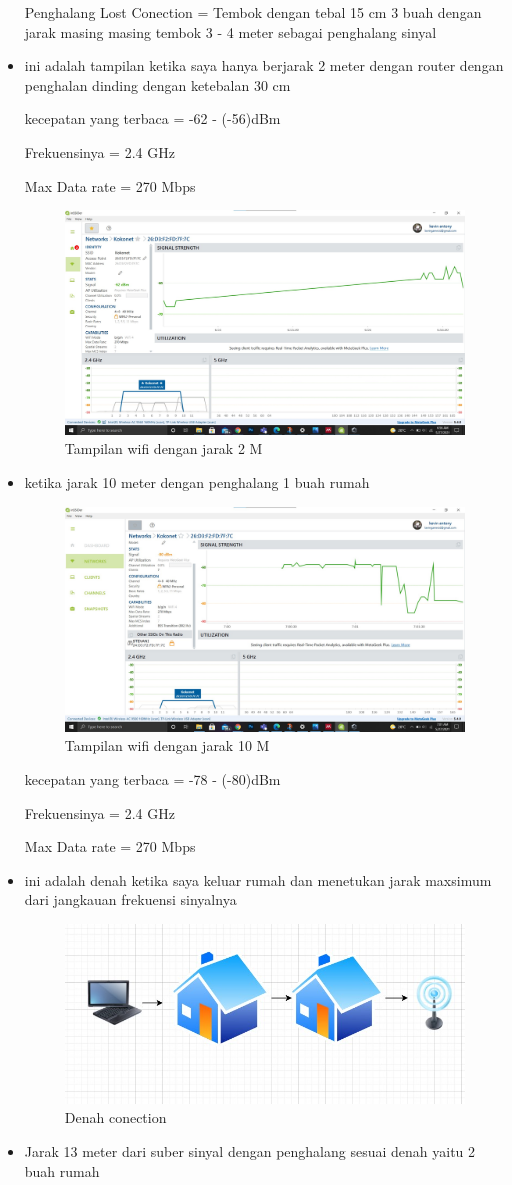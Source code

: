 \documentclass[conference]{IEEEtran}
\begin{document}
\begin{itemize}
Penghalang Lost Conection = Tembok dengan tebal 15 cm 3 buah dengan jarak masing masing tembok 3 - 4 meter sebagai penghalang sinyal 

\item ini adalah tampilan ketika saya hanya berjarak 2 meter dengan router dengan penghalan dinding dengan ketebalan 30 cm
\vspace{2pt}

kecepatan yang terbaca = -62 - (-56)dBm 
\vspace{1pt}

Frekuensinya = 2.4 GHz
\vspace{1pt}

Max Data rate = 270 Mbps
    \begin{figure}[h]
\centering
    \includegraphics[width=.4\textwidth]{image/007.jpg}
     \caption{Tampilan wifi dengan jarak 2 M}
     \end{figure}
\item ketika jarak 10 meter dengan penghalang 1 buah rumah
    \begin{figure}[h]
\centering
    \includegraphics[width=.3\textwidth]{image/008.jpg}
     \caption{Tampilan wifi dengan jarak 10 M}
     \end{figure}
     \vspace{2cm}
     
kecepatan yang terbaca = -78 - (-80)dBm 
\vspace{1pt}

Frekuensinya = 2.4 GHz
\vspace{1pt}

Max Data rate = 270 Mbps
\item ini adalah denah ketika saya keluar rumah dan menetukan jarak maxsimum dari jangkauan frekuensi sinyalnya
    \begin{figure}[h]
\centering
    \includegraphics[width=.4\textwidth]{image/006.jpg}
     \caption{Denah conection}
     \end{figure}
\item Jarak 13 meter dari suber sinyal dengan penghalang sesuai denah yaitu 2 buah rumah
\vspace{2pt}


\end{itemize}
\end{document}
